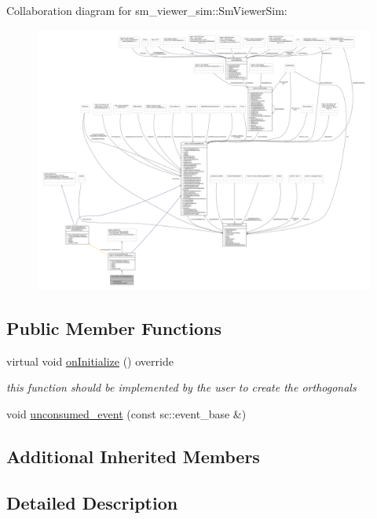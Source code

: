 Collaboration diagram for sm\+\_\+viewer\+\_\+sim\+:\+:Sm\+Viewer\+Sim\+:
\nopagebreak
\begin{figure}[H]
\begin{center}
\leavevmode
\includegraphics[width=350pt]{structsm__viewer__sim_1_1SmViewerSim__coll__graph}
\end{center}
\end{figure}
\subsection*{Public Member Functions}
\begin{DoxyCompactItemize}
\item 
virtual void \hyperlink{structsm__viewer__sim_1_1SmViewerSim_a1ad4e963a078af53a55097c6eb78cae0}{on\+Initialize} () override
\begin{DoxyCompactList}\small\item\em this function should be implemented by the user to create the orthogonals \end{DoxyCompactList}\item 
void \hyperlink{structsm__viewer__sim_1_1SmViewerSim_a7b9ef19f73db25f93b1b540eb744365b}{unconsumed\+\_\+event} (const sc\+::event\+\_\+base \&)
\end{DoxyCompactItemize}
\subsection*{Additional Inherited Members}


\subsection{Detailed Description}


